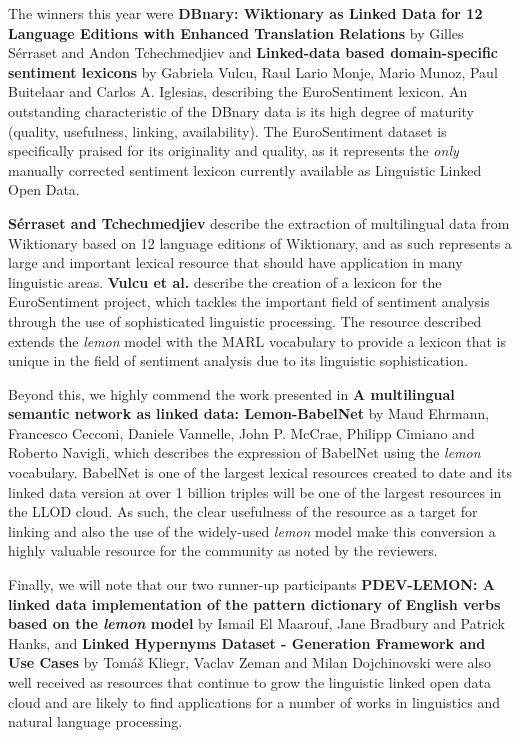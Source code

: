 The winners this year 
were \textbf{DBnary: Wiktionary as Linked Data for 12 Language Editions with Enhanced 
Translation Relations} by Gilles Sérraset and Andon Tchechmedjiev and \textbf{Linked-data 
based domain-specific sentiment lexicons} by Gabriela Vulcu, Raul Lario Monje, 
Mario Munoz, Paul Buitelaar and Carlos A. Iglesias, describing the EuroSentiment 
lexicon. 
An outstanding characteristic of the DBnary data is its high degree of maturity (quality, usefulness, linking, availability). 
The EuroSentiment dataset is specifically praised for its originality and quality, as it represents the \emph{only} manually corrected sentiment lexicon currently available as Linguistic Linked Open Data.

\textbf{Sérraset and Tchechmedjiev} describe the extraction of multilingual data from Wiktionary 
based on 12 language editions of Wiktionary, and as such represents a large and 
important lexical resource that should have application in many linguistic areas. 
\textbf{Vulcu et al.} describe the creation of a lexicon for the EuroSentiment project, which 
tackles the important field of sentiment analysis through the use of sophisticated 
linguistic processing. The resource described extends the \textit{lemon} model 
with the MARL vocabulary to provide a lexicon that is unique in the field of sentiment 
analysis due to its linguistic sophistication. 

Beyond this, we highly commend the work presented in \textbf{A multilingual semantic network as linked data: Lemon-BabelNet} by
Maud Ehrmann, Francesco Cecconi, Daniele Vannelle, John P. McCrae, Philipp Cimiano 
and Roberto Navigli, which describes the expression of BabelNet using the \textit{lemon} 
vocabulary. BabelNet is one of the largest lexical resources created to date and 
its linked data version at over 1 billion triples will be one of the largest resources 
in the LLOD cloud. As such, the clear usefulness of the resource as a target for 
linking and also the use of the widely-used \textit{lemon} model make this conversion 
a highly valuable resource for the community as noted by the reviewers. 

Finally, 
we will note that our two runner-up participants \textbf{PDEV-LEMON: A linked data implementation 
of the pattern dictionary of English verbs based on the \textit{lemon} model} 
by  Ismail El Maarouf, Jane Bradbury and Patrick Hanks, and \textbf{Linked Hypernyms Dataset - Generation Framework 
and Use Cases} by Tomáš Kliegr, Vaclav Zeman and Milan Dojchinovski were also well received as resources that 
continue to grow the linguistic linked open data cloud and are likely to find applications 
for a number of works in linguistics and natural language processing.

